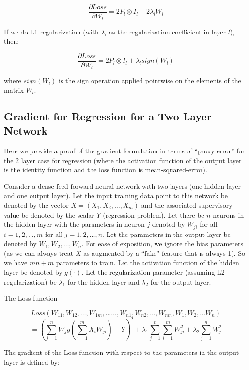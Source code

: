 \documentclass[10pt]{amsart}
\begin{document}
$$ \frac {\partial Loss}{\partial W_l} = 2 P_l \otimes I_l + 2 \lambda_l W_l$$

If we do L1 regularization (with $\lambda_l$ as the regularization coefficient in layer $l$), then:

$$ \frac {\partial Loss}{\partial W_l} = 2 P_l \otimes I_l + \lambda_l sign(W_l)$$

where $sign(W_l)$ is the sign operation applied pointwise on the elements of the matrix $W_l$.

\begin{appendices}

\section{Gradient for Regression for a Two Layer Network}
\label{appendix:RecursiveDerivation}

Here we provide a proof of the gradient formulation in terms of ``proxy error'' for the 2 layer case for regression (where the activation function of the output layer is the identity function and the loss function is mean-squared-error).

Consider a dense feed-forward neural network with two layers (one hidden layer and one output layer). Let the input training data point to this network be denoted by the vector $X = (X_1, X_2, \ldots, X_m)$ and the associated supervisory value be denoted by the scalar $Y$ (regression problem). Let there be $n$ neurons in the hidden layer with the parameters in neuron $j$ denoted by $W_{ji}$ for all $i = 1, 2, \ldots, m$ for all $j = 1, 2, \ldots, n$. Let the parameters in the output layer be denoted by $W_1, W_2, \ldots, W_n$. For ease of exposition, we ignore the bias parameters (as we can always treat $X$ as augmented by a ``fake'' feature that is always 1). So we have $mn + m$ parameters to train. Let the activation function of the hidden layer be denoted by $g(\cdot)$. Let the regularization parameter (assuming L2 regularization) be $\lambda_1$ for the hidden layer and $\lambda_2$ for the output layer.

The Loss function

$$Loss(W_{11}, W_{12}, \ldots, W_{1m}, \ldots \ldots, W_{n1}, W_{n2}, \ldots, W_{nm}, W_1, W_2, \ldots W_n)$$
$$ = (\sum_{j=1}^n W_j g(\sum_{i=1}^m X_i W_{ji}) - Y)^2 + \lambda_1 \sum_{j=1}^n \sum_{i=1}^m W_{ji}^2 + \lambda_2 \sum_{j=1}^n W_j^2$$

The gradient of the Loss function with respect to the parameters in the output layer is defined by:


\end{appendices}
\end{document}
